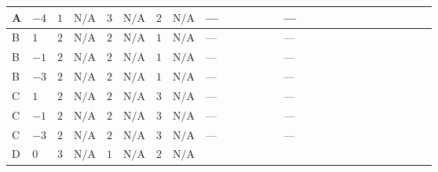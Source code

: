 \documentclass[8pt]{article}
\begin{document}
\begin{landscape}
\begin{longtable}{@{}llcccccc >{\raggedright\arraybackslash}p{0.21\linewidth} >{\raggedright\arraybackslash}p{0.21\linewidth} >{\raggedright\arraybackslash}p{0.21\linewidth}@{}}
\midrule
A & $-4$ & $1$ & $\text{N/A}$ & $3$ & $\text{N/A}$ & $2$ & $\text{N/A}$ & --- & --- & \scriptsize\adjustbox{max width=\linewidth}{$\begin{gathered} +6 {\lambda_{12}^{(1)}} {m_2^2}\end{gathered}$} \\
\midrule
B & $1$ & $2$ & $\text{N/A}$ & $2$ & $\text{N/A}$ & $1$ & $\text{N/A}$ & --- & --- & \scriptsize\adjustbox{max width=\linewidth}{$\begin{gathered} +4 {\lambda_{12}^{(1)}} {m_2^2}\end{gathered}$} \\
\midrule
B & $-1$ & $2$ & $\text{N/A}$ & $2$ & $\text{N/A}$ & $1$ & $\text{N/A}$ & --- & --- & \scriptsize\adjustbox{max width=\linewidth}{$\begin{gathered} +4 {\lambda_{12}^{(1)}} {m_2^2}\end{gathered}$} \\
\midrule
B & $-3$ & $2$ & $\text{N/A}$ & $2$ & $\text{N/A}$ & $1$ & $\text{N/A}$ & --- & --- & \scriptsize\adjustbox{max width=\linewidth}{$\begin{gathered} +4 {\lambda_{12}^{(1)}} {m_2^2}\end{gathered}$} \\
\midrule
C & $1$ & $2$ & $\text{N/A}$ & $2$ & $\text{N/A}$ & $3$ & $\text{N/A}$ & --- & --- & \scriptsize\adjustbox{max width=\linewidth}{$\begin{gathered} +4 {\lambda_{12}^{(1)}} {m_2^2}\end{gathered}$} \\
\midrule
C & $-1$ & $2$ & $\text{N/A}$ & $2$ & $\text{N/A}$ & $3$ & $\text{N/A}$ & --- & --- & \scriptsize\adjustbox{max width=\linewidth}{$\begin{gathered} +4 {\lambda_{12}^{(1)}} {m_2^2}\end{gathered}$} \\
\midrule
C & $-3$ & $2$ & $\text{N/A}$ & $2$ & $\text{N/A}$ & $3$ & $\text{N/A}$ & --- & --- & \scriptsize\adjustbox{max width=\linewidth}{$\begin{gathered} +4 {\lambda_{12}^{(1)}} {m_2^2}\end{gathered}$} \\
\midrule
D & $0$ & $3$ & $\text{N/A}$ & $1$ & $\text{N/A}$ & $2$ & $\text{N/A}$ & \scriptsize\adjustbox{max width=\linewidth}{$\begin{gathered} 20 {\mu_{\mathrm{T3GeneralS1Sq}}} \left({\lambda_{X_{9}}}\right)^{*}\end{gathered}$} & \scriptsize\adjustbox{max width=\linewidth}{$\begin{gathered} +20 {\lambda_{X_{9}}} \left({\mu_{\mathrm{T3GeneralS1Sq}}}\right)^{*}\end{gathered}$} & \scriptsize\adjustbox{max width=\linewidth}{$\begin{gathered} +2 {\lambda_{12}^{(1)}} {m_2^2}\end{gathered}$} \\

\end{longtable}
\end{landscape}
\end{document}
